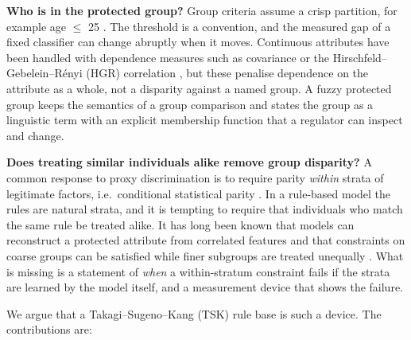\documentclass[pdflatex,sn-basic,Numbered,lineno]{sn-jnl}
\begin{document}
\textbf{Who is in the protected group?} Group criteria assume a crisp partition, for example age \ensuremath{\le} 25 \cite{lequy}. The threshold is a convention, and the measured gap of a fixed classifier can change abruptly when it moves. Continuous attributes have been handled with dependence measures such as covariance \cite{zafar} or the Hirschfeld--Gebelein--Rényi (HGR) correlation \cite{mary}, but these penalise dependence on the attribute as a whole, not a disparity against a named group. A fuzzy protected group keeps the semantics of a group comparison and states the group as a linguistic term with an explicit membership function that a regulator can inspect and change.

\textbf{Does treating similar individuals alike remove group disparity?} A common response to proxy discrimination is to require parity \emph{within} strata of legitimate factors, i.e.~conditional statistical parity \cite{kamiran2013,corbett}. In a rule-based model the rules are natural strata, and it is tempting to require that individuals who match the same rule be treated alike. It has long been known that models can reconstruct a protected attribute from correlated features \cite{pedreschi,lipton} and that constraints on coarse groups can be satisfied while finer subgroups are treated unequally \cite{kearns}. What is missing is a statement of \emph{when} a within-stratum constraint fails if the strata are learned by the model itself, and a measurement device that shows the failure.

We argue that a Takagi--Sugeno--Kang (TSK) rule base \cite{tsk} is such a device. The contributions are:
\end{document}

